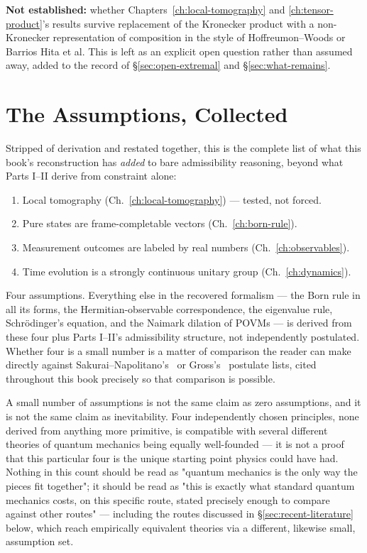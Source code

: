 \begin{ledgerentry}[Addendum]
\textbf{Not established:} whether Chapters~\ref{ch:local-tomography} and
\ref{ch:tensor-product}'s results survive replacement of the Kronecker
product with a non-Kronecker representation of composition in the style of
Hoffreumon--Woods or Barrios Hita et al. This is left as an explicit open
question rather than assumed away, added to the record of
\S\ref{sec:open-extremal} and \S\ref{sec:what-remains}.
\end{ledgerentry}

\section{The Assumptions, Collected}
\label{sec:assumptions-collected}

Stripped of derivation and restated together, this is the complete list of
what this book's reconstruction has \emph{added} to bare admissibility
reasoning, beyond what Parts I--II derive from constraint alone:

\begin{enumerate}
\item Local tomography (Ch.~\ref{ch:local-tomography}) — tested, not forced.
\item Pure states are frame-completable vectors (Ch.~\ref{ch:born-rule}).
\item Measurement outcomes are labeled by real numbers (Ch.~\ref{ch:observables}).
\item Time evolution is a strongly continuous unitary group
(Ch.~\ref{ch:dynamics}).
\end{enumerate}

Four assumptions. Everything else in the recovered formalism — the Born rule
in all its forms, the Hermitian-observable correspondence, the eigenvalue
rule, Schr\"odinger's equation, and the Naimark dilation of POVMs — is
derived from these four plus Parts I--II's admissibility structure, not
independently postulated. Whether four is a small number is a matter of
comparison the reader can make directly against
Sakurai--Napolitano's~\cite{sakurainapolitano} or Gross's~\cite{gross}
postulate lists, cited throughout this book precisely so that
comparison is possible.

\begin{scopebox}
\scopetitle{}A small number of assumptions is not the same claim as zero
assumptions, and it is not the same claim as inevitability. Four
independently chosen principles, none derived from anything more
primitive, is compatible with several different theories of quantum
mechanics being equally well-founded — it is not a proof that this
particular four is the unique starting point physics could have had.
Nothing in this count should be read as "quantum mechanics is the only
way the pieces fit together"; it should be read as "this is exactly what
standard quantum mechanics costs, on this specific route, stated
precisely enough to compare against other routes" — including the
routes discussed in \S\ref{sec:recent-literature} below, which reach
empirically equivalent theories via a different, likewise small,
assumption set.
\end{scopebox}

